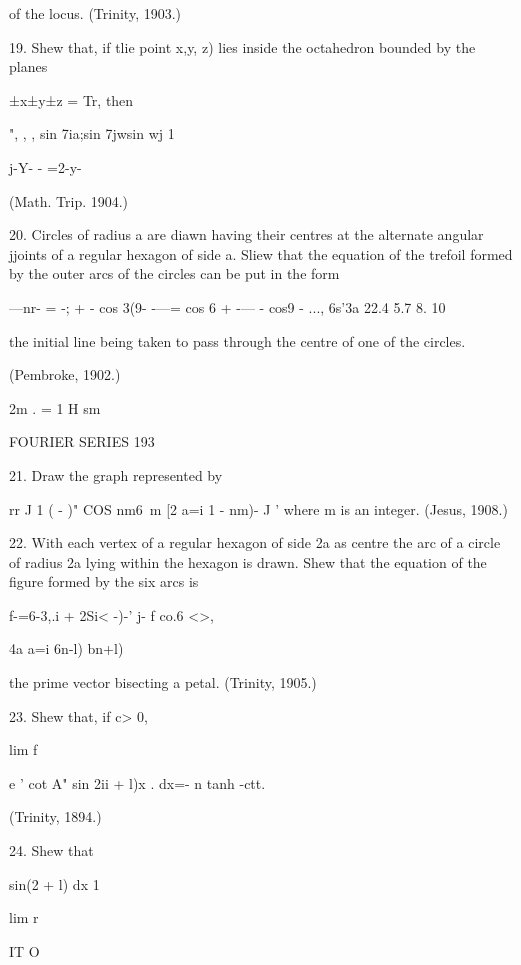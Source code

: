 {of the locus. (Trinity, 1903.)

19. Shew that, if tlie point x,y, z) lies inside the octahedron
bounded by the planes

±x±y±z = Tr, then

", , , sin 7ia;sin 7jwsin wj 1

 j-Y- - =2-y-

(Math. Trip. 1904.)

20. Circles of radius a are diawn having their centres at the
alternate angular jjoints of a regular hexagon of side a. Sliew that
the equation of the trefoil formed by the outer arcs of the circles
can be put in the form

—nr- = -; + - cos 3(9- -—= cos 6 + -— - cos9 - ..., 6s'3a 22.4 5.7 8.
10

the initial line being taken to pass through the centre of one of the
circles.

(Pembroke, 1902.)



2m . = 1 H sm



FOURIER SERIES 193

21. Draw the graph represented by

rr J 1 ( - )" COS nm6\ m [2 a=i 1 - nm)- J ' where m is an integer.
(Jesus, 1908.)

22. With each vertex of a regular hexagon of side 2a as centre the arc
of a circle of radius 2a lying within the hexagon is drawn. Shew that
the equation of the figure formed by the six arcs is

f-=6-3,.i + 2Si< -)-' j- f co.6 <>,

4a a=i 6n-l) bn+l)

the prime vector bisecting a petal. (Trinity, 1905.)

23. Shew that, if c> 0,



lim f



e ' cot A" sin 2ii + l)x . dx=- n tanh -ctt.



(Trinity, 1894.)



24. Shew that

sin(2 + l) dx 1



lim r



IT O



}

